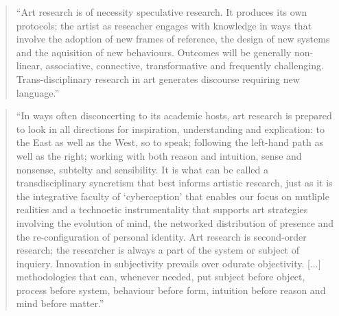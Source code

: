 
\begin{quote}
  ``Art research is of necessity speculative research. It produces its own protocols; the artist as reseacher engages with knowledge in ways that involve the adoption of new frames of reference, the design of new systems and the aquisition of new behaviours. Outcomes will be generally non-linear, associative, connective, transformative and frequently challenging. Trans-disciplinary research in art generates discourse requiring new language.''\autocite[Roy Ascott's preface in][p. v]{Candy2011}
\end{quote}

\begin{quote}
  ``In ways often disconcerting to its academic hosts, art research is prepared to look in all directions for inspiration, understanding and explication: to the East as well as the West, so to speak; following the left-hand path as well as the right; working with both reason and intuition, sense and nonsense, subtelty and sensibility. It is what can be called a transdisciplinary syncretism that best informs artistic research, just as it is the integrative faculty of ‘cyberception’ that enables our focus on mutliple realities and a technoetic instrumentality that supports art strategies involving the evolution of mind, the networked distribution of presence and the re-configuration of personal identity. Art research is second-order research; the researcher is always a part of the system or subject of inquiery. Innovation in subjectivity prevails over odurate objectivity. [...] methodologies that can, whenever needed, put subject before object, process before system, behaviour before form, intuition before reason and mind before matter.''\autocite[Roy Ascott's preface in][p. vi]{Candy2011}
\end{quote}

